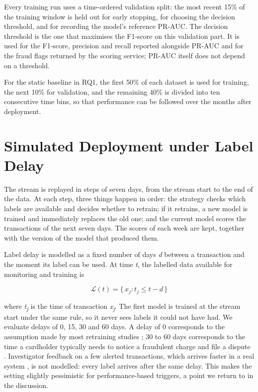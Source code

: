 Every training run uses a time-ordered validation split: the most recent 15\% of the training window is held out for early stopping, for choosing the decision threshold, and for recording the model's reference PR-AUC. The decision threshold is the one that maximises the F1-score on this validation part. It is used for the F1-score, precision and recall reported alongside PR-AUC and for the fraud flags returned by the scoring service; PR-AUC itself does not depend on a threshold.

For the static baseline in RQ1, the first 50\% of each dataset is used for training, the next 10\% for validation, and the remaining 40\% is divided into ten consecutive time bins, so that performance can be followed over the months after deployment.

\section{Simulated Deployment under Label Delay}

The stream is replayed in steps of seven days, from the stream start to the end of the data. At each step, three things happen in order: the strategy checks which labels are available and decides whether to retrain; if it retrains, a new model is trained and immediately replaces the old one; and the current model scores the transactions of the next seven days. The scores of each week are kept, together with the version of the model that produced them.

Label delay is modelled as a fixed number of days \textit{d} between a transaction and the moment its label can be used. At time \textit{t}, the labelled data available for monitoring and training is

\begin{equation}
  \mathcal{L}(t) = \{\, x_j : t_j \le t - d \,\}
  \label{eq:labelled}
\end{equation}

where \textit{t\textsubscript{j}} is the time of transaction \textit{x\textsubscript{j}}. The first model is trained at the stream start under the same rule, so it never sees labels it could not have had. We evaluate delays of 0, 15, 30 and 60 days. A delay of 0 corresponds to the assumption made by most retraining studies \cite{yelleti2025,wong2025}; 30 to 60 days corresponds to the time a cardholder typically needs to notice a fraudulent charge and file a dispute \cite{dalpozzolo2018}. Investigator feedback on a few alerted transactions, which arrives faster in a real system \cite{dalpozzolo2018}, is not modelled: every label arrives after the same delay. This makes the setting slightly pessimistic for performance-based triggers, a point we return to in the discussion.

